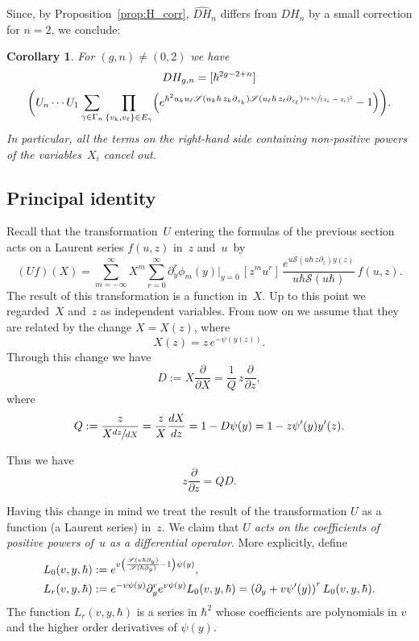 \documentclass[JEP,XML,SOM,Unicode,NoEqCountersInSection,NoFloatCountersInSection]{cedram}
\let\mathcal\mathscr
\theoremstyle{plain}
\newtheorem{corollary}[theorem]{Corollary}
\theoremstyle{definition}
\theoremstyle{remark}
\newcommand{\cS}{\mathcal{S}}
\begin{document}
Since, by Proposition~\ref{prop:H_corr}, $\widehat{DH}_n$ differs from $DH_n$ by a small correction for $n=2$, we conclude:

\begin{corollary}\label{cor:preDHgn}
For $(g,n)\ne(0,2)$ we have
\begin{multline}\label{eq:preDHgn}
DH_{g,n}=[\hbar^{2g-2+n}]\\
\biggl(U_n\cdots U_1
\sum_{\gamma \in \Gamma_n}\prod_{\{v_k,v_\ell\}\in E_\gamma}
\Bigl(e^{\hbar^2u_ku_\ell\cS(u_k\hbar\,z_k\partial_{z_k})\cS(u_\ell\hbar\,z_\ell \partial_{z_\ell})
\sfrac{z_k z_\ell}{(z_k-z_\ell)^2}}-1\Bigr)
\biggr).
\end{multline}
In particular, all the terms on the right-hand side containing non-positive powers of the variables~$X_i$ cancel out.
\end{corollary}

\subsection{Principal identity}\label{sec:princid}

Recall that the transformation~$U$ entering the formulas of the previous section acts on a Laurent series $f(u,z)$ in~$z$ and~$u$~by
\begin{equation*}
(U f)(X)=\sum_{m=-\infty}^\infty X^{m}\sum_{r=0}^\infty
\partial_y^{r}\phi_{m}(y)\big|_{y=0}\,[z^mu^r]\,
\frac{e^{ u\cS(u\hbar\,z\partial_z)y(z) }}{u\hbar\cS(u\hbar)}\,f(u,z).
\end{equation*}
The result of this transformation is a function in~$X$. Up to this point we regarded~$X$ and~$z$ as independent variables. From now on we assume that they are related by the change $X=X(z)$, where
\begin{equation}\label{eq:Xdef}
X(z)=z\,e^{-\psi(y(z))}.
\end{equation}
Through this change we have
\[
D:=X\frac{\partial}{\partial X}=\frac{1}{Q}\,z\frac{\partial}{\partial z},
\]
where
\[
Q:=\frac{z}{X\sfrac{dz}{dX}}=\frac{z}{X}\frac{dX}{dz}=1-D\psi(y)=1-z\psi'(y)y'(z).
\]

Thus we have
\begin{equation*}\label{eq:zdzQD}
z\dfrac{\partial}{\partial z} = QD.
\end{equation*}

Having this change in mind we treat the result of the transformation $U$ as a function (a Laurent series) in~$z$. We claim that \emph{$U$ acts on the coefficients of positive powers of~$u$ as a differential operator}. More explicitly, define
\begin{align}
L_0(v,y,\hbar)&:=e^{v\left(\frac{\cS(v\hbar\partial_y)}{\cS(\hbar\partial_y)}-1\right)\psi(y)},\notag\\ \label{eq:Lrdef}
L_r(v,y,\hbar)&:=e^{-v\psi(y)}\partial_y^re^{v\psi(y)}L_0(v,y,\hbar)
=\left(\partial_y+v\psi'(y)\right)^rL_0(v,y,\hbar).
\end{align}
The function $L_r(v,y,\hbar)$ is a series in $\hbar^2$ whose coefficients are polynomials in $v$ and the higher order derivatives of $\psi(y)$.
\end{document}
